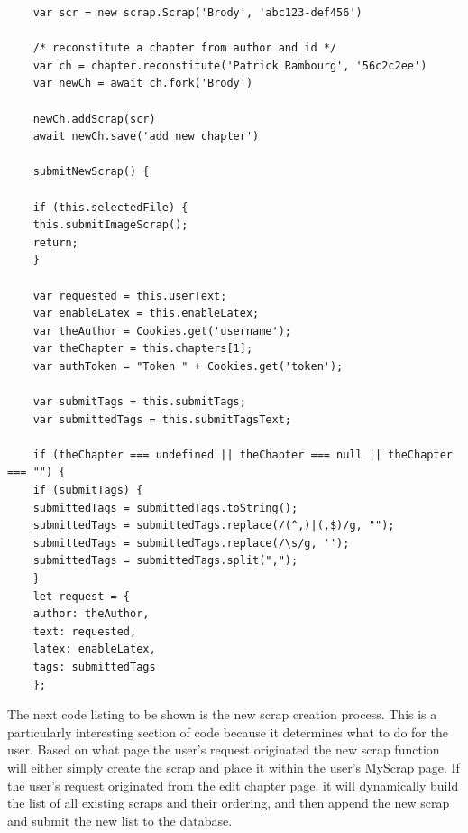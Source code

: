 \documentclass[onecolumn, draftclsnofoot,10pt, compsoc]{IEEEtran}
\begin{document}
	\begin{lstlisting}
	var scr = new scrap.Scrap('Brody', 'abc123-def456')
	
	/* reconstitute a chapter from author and id */
	var ch = chapter.reconstitute('Patrick Rambourg', '56c2c2ee')
	var newCh = await ch.fork('Brody')
	
	newCh.addScrap(scr)
	await newCh.save('add new chapter')

	submitNewScrap() {
	
	if (this.selectedFile) {
	this.submitImageScrap();
	return;
	}
	
	var requested = this.userText;
	var enableLatex = this.enableLatex;
	var theAuthor = Cookies.get('username');
	var theChapter = this.chapters[1];
	var authToken = "Token " + Cookies.get('token');
	
	var submitTags = this.submitTags;
	var submittedTags = this.submitTagsText;
	
	if (theChapter === undefined || theChapter === null || theChapter === "") {
	if (submitTags) {
	submittedTags = submittedTags.toString();
	submittedTags = submittedTags.replace(/(^,)|(,$)/g, "");
	submittedTags = submittedTags.replace(/\s/g, '');
	submittedTags = submittedTags.split(",");
	}
	let request = {
	author: theAuthor,
	text: requested,
	latex: enableLatex,
	tags: submittedTags
	};
	\end{lstlisting}
	
	
	\newpage
	
	The next code listing to be shown is the new scrap creation process. This is a particularly interesting section of code because it determines what to do for the user. Based on what page the user's request originated the new scrap function will either simply create the scrap and place it within the user's MyScrap page. If the user's request originated from the edit chapter page, it will dynamically build the list of all existing scraps and their ordering, and then append the new scrap and submit the new list to the database.
	
\end{document}
